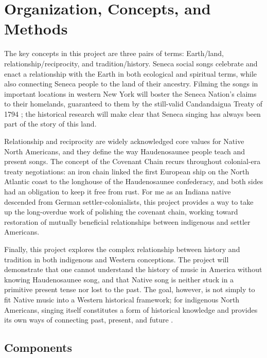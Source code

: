 \documentclass{neh}
\begin{document}
\clearpage
\section{Organization, Concepts, and Methods}

The key concepts in this project are three pairs of terms: Earth/land,
relationship/reciprocity, and tradition/history.
Seneca social songs celebrate and enact a relationship with the Earth in both
ecological and spiritual terms, while also connecting Seneca people to the
land of their ancestry.
Filming the songs in important locations in western New York will boster
the Seneca Nation's claims to their homelands, guaranteed to them by
the still-valid Candandaigua Treaty of 1794
\Autocites{Deloria:BrokenTreaties}{BasicCall}; the historical research will
make clear that Seneca singing has always been part of the story of this land.

Relationship and reciprocity are widely acknowledged core values for Native
North Americans, and they define the way Haudenosaunee people teach and
present songs.
The concept of the Covenant Chain recurs throughout colonial-era treaty
negotiations: an iron chain linked the first European ship on the North
Atlantic coast to the longhouse of the Haudenosaunee confederacy, and both
sides had an obligation to keep it free from rust.
For me as an Indiana native descended from German settler-colonialists, this
project provides a way to take up the long-overdue work of polishing the
covenant chain, working toward restoration of mutually beneficial
relationships between indigenous and settler Americans. 

Finally, this project explores the complex relationship between history and
tradition in both indigenous and Western conceptions.
The project will demonstrate that one cannot understand the history of music
in America without knowing Haudenosaunee song, and that Native song is neither 
stuck in a primitive present tense nor lost to the past.
The goal, however, is not simply to fit Native music into a Western historical
framework; 
for indigenous North Americans, singing itself constitutes a form of
historical knowledge and provides its own ways of connecting past, present,
and future
\Autocite{Diamond:NativeAmericanHistory}.
\subsection{Components}
\end{document}
